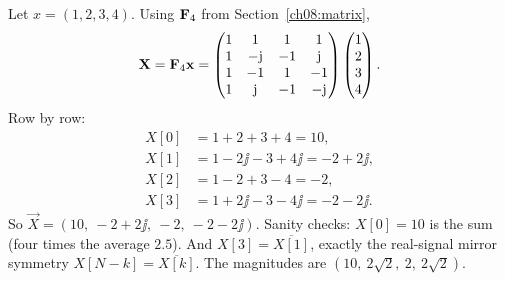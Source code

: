 \begin{example}
\label{ch08:ex-4pt}
Let $x = (1, 2, 3, 4)$. Using $\mathbf{F}_4$ from Section~\ref{ch08:matrix},
\[
\mathbf{X} = \mathbf{F}_4 \mathbf{x} =
\begin{pmatrix}
1 & 1 & 1 & 1\\
1 & -\mathrm{j} & -1 & \mathrm{j}\\
1 & -1 & 1 & -1\\
1 & \mathrm{j} & -1 & -\mathrm{j}
\end{pmatrix}
\begin{pmatrix} 1\\2\\3\\4 \end{pmatrix}.
\]
Row by row:
\begin{align*}
X[0] &= 1+2+3+4 = 10, \\
X[1] &= 1 - 2\jj - 3 + 4\jj = -2 + 2\jj, \\
X[2] &= 1 - 2 + 3 - 4 = -2, \\
X[3] &= 1 + 2\jj - 3 - 4\jj = -2 - 2\jj.
\end{align*}
So $\vec{X} = (10,\ -2+2\jj,\ -2,\ -2-2\jj)$. Sanity checks: $X[0]=10$ is the sum
(four times the average $2.5$). And $X[3] = \overline{X[1]}$, exactly the
real-signal mirror symmetry $X[N-k]=\overline{X[k]}$. The magnitudes are
$(10,\ 2\sqrt2,\ 2,\ 2\sqrt2)$.


\end{example}
